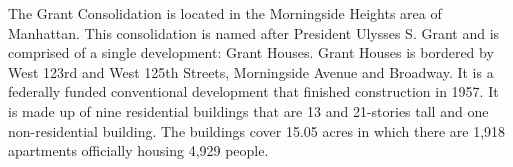     

  

The Grant Consolidation is located in the Morningside Heights area of Manhattan. This consolidation is named after President Ulysses S. Grant and is comprised of a single development: Grant Houses. Grant Houses is bordered by West 123rd and West 125th Streets, Morningside Avenue and Broadway. It is a federally funded conventional development that finished construction in 1957. It is made up of nine residential buildings that are 13 and 21-stories tall and one non-residential building. The buildings cover 15.05 acres in which there are 1,918 apartments officially housing 4,929 people.   